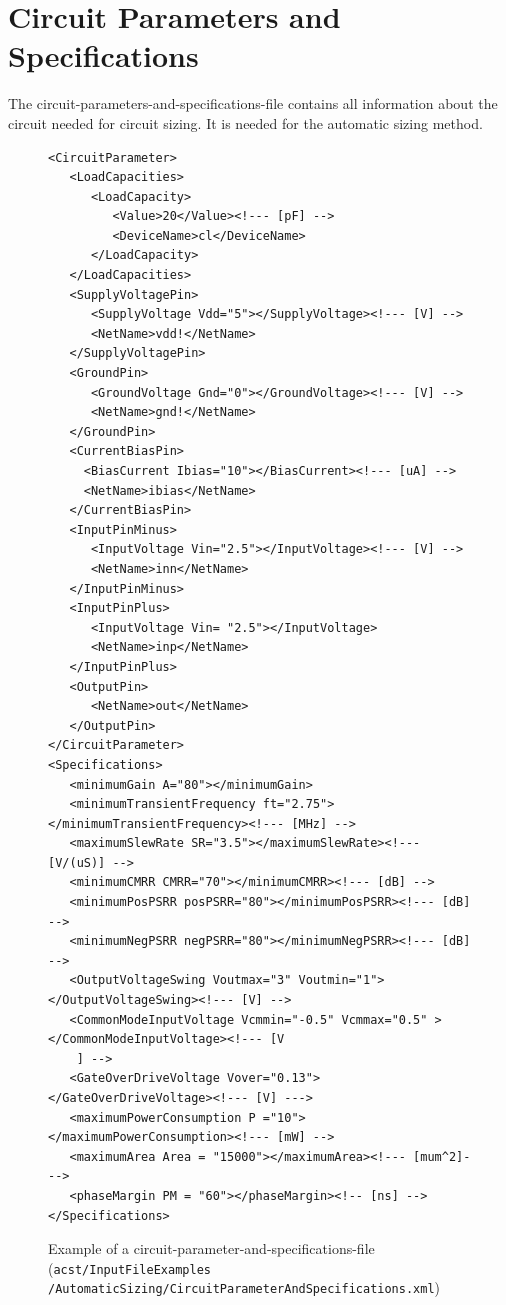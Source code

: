 \section{Circuit Parameters and Specifications}\label{sec:inputFileCircuitParametersAndSpecifications}
The circuit-parameters-and-specifications-file contains all information about the circuit needed for circuit sizing. It is needed for the automatic sizing method. 
\begin{figure}[H]
	\begin{lstlisting}[basicstyle=\ttfamily\scriptsize,backgroundcolor={\color{gray!30}}, escapechar=? ]
<CircuitParameter>
   <LoadCapacities>
      <LoadCapacity>
         <Value>20</Value><!--- [pF] -->
         <DeviceName>cl</DeviceName>
      </LoadCapacity>
   </LoadCapacities>
   <SupplyVoltagePin>
      <SupplyVoltage Vdd="5"></SupplyVoltage><!--- [V] -->
      <NetName>vdd!</NetName>
   </SupplyVoltagePin>
   <GroundPin>
      <GroundVoltage Gnd="0"></GroundVoltage><!--- [V] -->
      <NetName>gnd!</NetName>
   </GroundPin>
   <CurrentBiasPin>
     <BiasCurrent Ibias="10"></BiasCurrent><!--- [uA] -->
     <NetName>ibias</NetName>
   </CurrentBiasPin>
   <InputPinMinus>
      <InputVoltage Vin="2.5"></InputVoltage><!--- [V] -->
      <NetName>inn</NetName>
   </InputPinMinus>
   <InputPinPlus>
      <InputVoltage Vin= "2.5"></InputVoltage>
      <NetName>inp</NetName>
   </InputPinPlus>
   <OutputPin>
      <NetName>out</NetName>
   </OutputPin>
</CircuitParameter>
<Specifications>
   <minimumGain A="80"></minimumGain>
   <minimumTransientFrequency ft="2.75"></minimumTransientFrequency><!--- [MHz] -->
   <maximumSlewRate SR="3.5"></maximumSlewRate><!--- [V/(uS)] -->
   <minimumCMRR CMRR="70"></minimumCMRR><!--- [dB] -->
   <minimumPosPSRR posPSRR="80"></minimumPosPSRR><!--- [dB] -->
   <minimumNegPSRR negPSRR="80"></minimumNegPSRR><!--- [dB] -->
   <OutputVoltageSwing Voutmax="3" Voutmin="1"></OutputVoltageSwing><!--- [V] -->
   <CommonModeInputVoltage Vcmmin="-0.5" Vcmmax="0.5" ></CommonModeInputVoltage><!--- [V
    ] -->
   <GateOverDriveVoltage Vover="0.13"></GateOverDriveVoltage><!--- [V] --->
   <maximumPowerConsumption P ="10"></maximumPowerConsumption><!--- [mW] -->
   <maximumArea Area = "15000"></maximumArea><!--- [mum^2]--->
   <phaseMargin PM = "60"></phaseMargin><!-- [ns] -->
</Specifications>
	\end{lstlisting}
	\caption{Example of a circuit-parameter-and-specifications-file ({\tt acst/InputFileExamples \protect \linebreak /AutomaticSizing/CircuitParameterAndSpecifications.xml})}
\end{figure}

